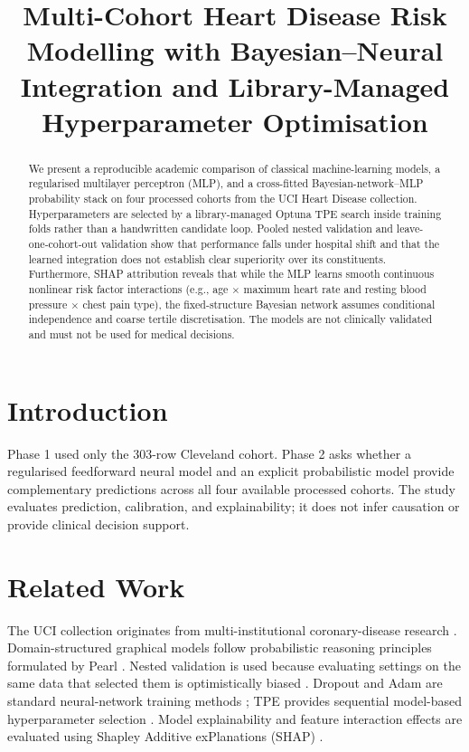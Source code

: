 \documentclass[conference]{IEEEtran}
\title{Multi-Cohort Heart Disease Risk Modelling with Bayesian--Neural Integration and Library-Managed Hyperparameter Optimisation}
\author{\IEEEauthorblockN{Hardik Hathwal, Ayush, Akshith, Vansh, Kabir}
\IEEEauthorblockA{Supervisor: Mr. Shobhit Johri\\
Newton School of Technology, Rishihood University\\
Roll Nos: 2401010176, 2401010121, 2401010230, 2401010494, 2401010205}}
\begin{document}
\maketitle

\begin{abstract}
We present a reproducible academic comparison of classical machine-learning models, a regularised multilayer perceptron (MLP), and a cross-fitted Bayesian-network--MLP probability stack on four processed cohorts from the UCI Heart Disease collection. Hyperparameters are selected by a library-managed Optuna TPE search inside training folds rather than a handwritten candidate loop. Pooled nested validation and leave-one-cohort-out validation show that performance falls under hospital shift and that the learned integration does not establish clear superiority over its constituents. Furthermore, SHAP attribution reveals that while the MLP learns smooth continuous nonlinear risk factor interactions (e.g., age $\times$ maximum heart rate and resting blood pressure $\times$ chest pain type), the fixed-structure Bayesian network assumes conditional independence and coarse tertile discretisation. The models are not clinically validated and must not be used for medical decisions.
\end{abstract}

\section{Introduction}
Phase 1 used only the 303-row Cleveland cohort. Phase 2 asks whether a regularised feedforward neural model and an explicit probabilistic model provide complementary predictions across all four available processed cohorts. The study evaluates prediction, calibration, and explainability; it does not infer causation or provide clinical decision support.

\section{Related Work}
The UCI collection originates from multi-institutional coronary-disease research \cite{uci,detrano}. Domain-structured graphical models follow probabilistic reasoning principles formulated by Pearl \cite{pearl}. Nested validation is used because evaluating settings on the same data that selected them is optimistically biased \cite{varma}. Dropout and Adam are standard neural-network training methods \cite{dropout,adam}; TPE provides sequential model-based hyperparameter selection \cite{bergstra,optuna}. Model explainability and feature interaction effects are evaluated using Shapley Additive exPlanations (SHAP) \cite{shap}.
\end{document}
